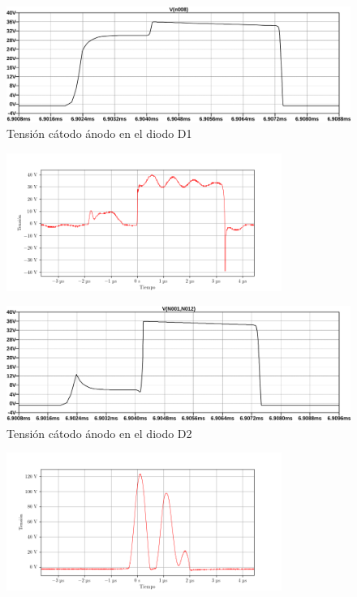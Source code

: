 \begin{figure}[H]
    \centering
    \includegraphics[width=\textwidth]{images/sim/24.pdf}
    \caption{Tensión cátodo ánodo en el diodo D1}
    \label{fig:sim:24}
\end{figure}

\begin{figure}[H]
    \centering
    \includegraphics[width=0.8\textwidth]{images/capturas-osciloscopio/17-11-2022/61.png}
    \caption{}
    \label{fig:osc:61}
\end{figure}

\begin{figure}[H]
    \centering
    \includegraphics[width=\textwidth]{images/sim/25.pdf}
    \caption{Tensión cátodo ánodo en el diodo D2}
    \label{fig:sim:25}
\end{figure}

\begin{figure}[H]
    \centering
    \includegraphics[width=0.8\textwidth]{images/capturas-osciloscopio/17-11-2022/62.png}
    \caption{}
    \label{fig:osc:62}
\end{figure}

